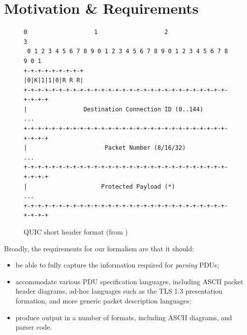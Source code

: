 \documentclass[10pt,sigconf]{acmart}
\begin{document}
%
%

\section{Motivation \& Requirements}
\label{sec:motivation}

\begin{figure}
	\centering
	\vspace{3mm}
    \begin{BVerbatim}[fontsize=\scriptsize]
 0                   1                   2                   3
 0 1 2 3 4 5 6 7 8 9 0 1 2 3 4 5 6 7 8 9 0 1 2 3 4 5 6 7 8 9 0 1
+-+-+-+-+-+-+-+-+
|0|K|1|1|0|R R R|
+-+-+-+-+-+-+-+-+-+-+-+-+-+-+-+-+-+-+-+-+-+-+-+-+-+-+-+-+-+-+-+-+
|                Destination Connection ID (0..144)           ...
+-+-+-+-+-+-+-+-+-+-+-+-+-+-+-+-+-+-+-+-+-+-+-+-+-+-+-+-+-+-+-+-+
|                      Packet Number (8/16/32)                ...
+-+-+-+-+-+-+-+-+-+-+-+-+-+-+-+-+-+-+-+-+-+-+-+-+-+-+-+-+-+-+-+-+
|                     Protected Payload (*)                   ...
+-+-+-+-+-+-+-+-+-+-+-+-+-+-+-+-+-+-+-+-+-+-+-+-+-+-+-+-+-+-+-+-+
    \end{BVerbatim}
    \caption{QUIC short header format (from \cite{draft-ietf-quic-transport-latest})}
    \label{fig:quic-short-hdr}
\end{figure}

Broadly, the requirements for our formalism are that it should:
\begin{itemize}
	\item be able to fully capture the information required for \emph{parsing} PDUs;
	\item accommodate various PDU specification languages, including ASCII
		  packet header diagrams, ad-hoc languages
		  such as the TLS 1.3 presentation formation, and more generic packet description
		  languages;
	\item produce output in a number of formats, including ASCII diagrams, and parser
		  code.
\end{itemize}
\end{document}
